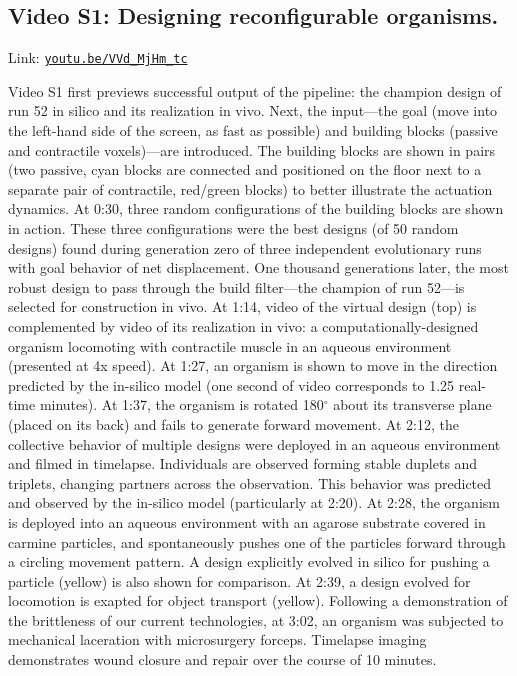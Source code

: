 \subsection*{Video S1: Designing reconfigurable organisms.}

Link:
\href{https://youtu.be/VVd_MjHm_tc}{\tt\color{blue}youtu.be/VVd\_MjHm\_tc}

\vspace{1em}

Video S1 first previews successful output of the pipeline: the champion design of run 52 in silico and its realization in vivo. 
Next, the input---the goal (move into the left-hand side of the screen, as fast as possible) and building blocks (passive and contractile voxels)---are introduced. 
The building blocks are shown in pairs (two passive, cyan blocks are connected and positioned on the floor next to a separate pair of contractile, red/green blocks) to better illustrate the actuation dynamics. 
At 0:30, three random configurations of the building blocks are shown in action. 
These three configurations were the best designs (of 50 random designs) found during generation zero of three independent evolutionary runs with goal behavior of net displacement. 
One thousand generations later, the most robust design to pass through the build filter---the champion of run 52---is selected for construction in vivo. 
At 1:14, video of the virtual design (top) is complemented by video of its realization in vivo: a computationally-designed organism locomoting with contractile muscle in an aqueous environment (presented at 4x speed). 
At 1:27, an organism is shown to move in the direction predicted by the in-silico model (one second of video corresponds to 1.25 real-time minutes). 
At 1:37, the organism is rotated 180{$^{\circ}$} about its transverse plane (placed on its back) and fails to generate forward movement. 
At 2:12, the collective behavior of multiple designs were deployed in an aqueous environment and filmed in timelapse. Individuals are observed forming stable duplets and triplets, changing partners across the observation. 
This behavior was predicted and observed by the in-silico model (particularly at 2:20). 
At 2:28, the organism is deployed into an aqueous environment with an agarose substrate covered in carmine particles, and spontaneously pushes one of the particles forward through a circling movement pattern. 
A design explicitly evolved in silico for pushing a particle (yellow) is also shown for comparison. 
At 2:39, a design evolved for locomotion is exapted for object transport (yellow). 
Following a demonstration of the brittleness of our current technologies, at 3:02, an organism was subjected to mechanical laceration with microsurgery forceps. 
Timelapse imaging demonstrates wound closure and repair over the course of 10 minutes.


